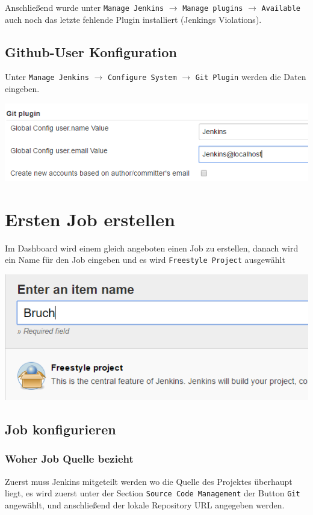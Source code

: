 Anschließend wurde unter \verb|Manage Jenkins|  $\rightarrow$ \verb|Manage plugins| $\rightarrow$ \verb|Available| auch noch das letzte fehlende Plugin installiert (Jenkings Violations).

\subsection{Github-User Konfiguration}
Unter \verb|Manage Jenkins|  $\rightarrow$ \verb|Configure System| $\rightarrow$ \verb|Git Plugin| werden die Daten eingeben. 

\begin{minipage}{\linewidth}
	\centering
	\includegraphics[width=0.8\linewidth]{images/git_plugin}
\end{minipage}

\section{Ersten Job erstellen}
Im Dashboard wird einem gleich angeboten einen Job zu erstellen, danach wird ein Name für den Job eingeben und es wird \verb|Freestyle Project| ausgewählt

\begin{minipage}{\linewidth}
	\centering
	\includegraphics[width=0.8\linewidth]{images/new_job}
\end{minipage}

\subsection{Job konfigurieren}
\subsubsection{Woher Job Quelle bezieht}
Zuerst muss Jenkins mitgeteilt werden wo die Quelle des Projektes überhaupt liegt, es wird zuerst unter der Section \verb|Source Code Management| der Button \verb|Git| angewählt, und anschließend der lokale Repository URL angegeben werden.

